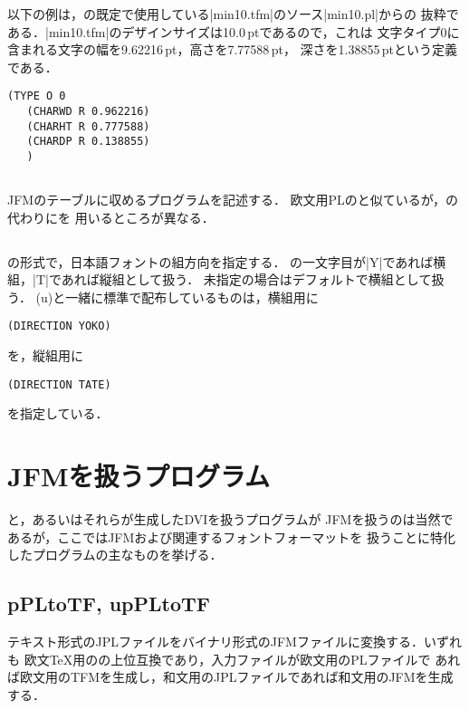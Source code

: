 \documentclass[a4paper,11pt,nomag]{jsarticle}
\begin{document}
以下の例は，\pTeX の既定で使用している|min10.tfm|のソース|min10.pl|からの
抜粋である．|min10.tfm|のデザインサイズは10.0\,ptであるので，これは
文字タイプ0に含まれる文字の幅を9.62216\,pt，高さを7.77588\,pt，
深さを1.38855\,ptという定義である．
\begin{verbatim}
(TYPE O 0
   (CHARWD R 0.962216)
   (CHARHT R 0.777588)
   (CHARDP R 0.138855)
   )
\end{verbatim}

\subsection{}
JFMのテーブルに収めるプログラムを記述する．
欧文用PLのと似ているが，の代わりにを
用いるところが異なる．

\subsection{}
の形式で，日本語フォントの組方向を指定する．
の一文字目が|Y|であれば横組，|T|であれば縦組として扱う．
未指定の場合はデフォルトで横組として扱う．
(u)\pTeX と一緒に標準で配布しているものは，横組用に
\begin{verbatim}
(DIRECTION YOKO)
\end{verbatim}
を，縦組用に
\begin{verbatim}
(DIRECTION TATE)
\end{verbatim}
を指定している．

\clearpage


\section{JFMを扱うプログラム}\label{jfm-program}

\pTeX と\upTeX ，あるいはそれらが生成したDVIを扱うプログラムが
JFMを扱うのは当然であるが，ここではJFMおよび関連するフォントフォーマットを
扱うことに特化したプログラムの主なものを挙げる．

\subsection{pPLtoTF, upPLtoTF}

テキスト形式のJPLファイルをバイナリ形式のJFMファイルに変換する．いずれも
欧文\TeX 用のの上位互換であり，入力ファイルが欧文用のPLファイルで
あれば欧文用のTFMを生成し，和文用のJPLファイルであれば和文用のJFMを生成する．
\end{document}

